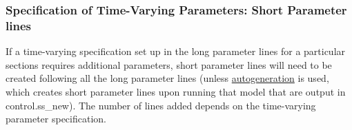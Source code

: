 
	 
\subsubsection{Specification of Time-Varying Parameters: Short Parameter lines} 

If a time-varying specification set up in the long parameter lines for a particular sections requires additional parameters, short parameter lines will need to be created following all the long parameter lines (unless \hyperlink{autogen}{autogeneration} is used, which creates short parameter lines upon running that model that are output in control.ss_new). The number of lines added depends on the time-varying parameter specification.

